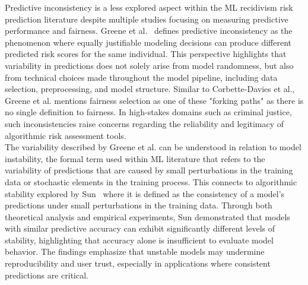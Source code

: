 \documentclass[12pt]{article}
\begin{document}
Predictive inconsistency is a less explored aspect within the ML recidivism risk prediction  literature despite multiple studies focusing on measuring predictive performance and fairness. Greene et al.~\cite{greene2022forks} defines predictive inconsistency as the phenomenon where equally justifiable modeling decisions can produce different predicted risk scores for the same individual. This perspective highlights that variability in predictions does not solely arise from model randomness, but also from technical choices made throughout the model pipeline, including data selection, preprocessing, and model structure. Similar to Corbette-Davies et al., Greene et al. mentions fairness selection as one of these "forking paths" as there is no single definition to fairness. In high-stakes domains such as criminal justice, such inconsistencies raise concerns regarding the reliability and legitimacy of algorithmic risk assessment tools.\\

The variability described by Greene et al. can be understood in relation to model instability, the formal term used within ML literature that refers to the variability of predictions that are caused by small perturbations in the training data or stochastic elements in the training process. This connects to algorithmic stability explored by Sun~\cite{sun2015stability} where it is defined as the consistency of a model's predictions under small perturbations in the training data. Through both theoretical analysis and empirical experiments, Sun demonstrated that models with similar predictive accuracy can exhibit significantly different levels of stability, highlighting that accuracy alone is insufficient to evaluate model behavior. The findings emphasize that unstable models may undermine reproducibility and user trust, especially in applications where consistent predictions are critical. \\
\end{document}
